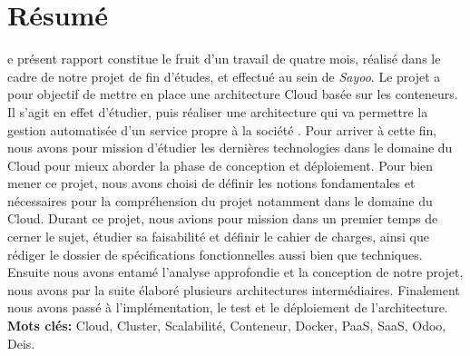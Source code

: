 
\chapter*{Résumé}

\begin{onehalfspace}
e présent rapport constitue le fruit d'un travail de quatre mois, réalisé dans le cadre de notre projet de fin d'études, et effectué au sein de \emph{Sayoo}. Le projet a pour objectif de mettre en place une architecture Cloud basée sur les conteneurs.
\newline
\newline
Il s'agit en effet d'étudier, puis réaliser une architecture qui va permettre la gestion automatisée d'un service propre à la société . Pour arriver à cette fin, nous avons pour mission d'étudier les dernières technologies dans le domaine du Cloud pour mieux aborder la phase de conception et déploiement. 
\noindent Pour bien mener ce projet, nous avons choisi de définir les notions fondamentales et nécessaires pour la compréhension du projet notamment dans le domaine du Cloud.
\newline
\newline
Durant ce projet, nous avions pour mission dans un premier temps de cerner le sujet, étudier sa faisabilité et définir le cahier de charges, ainsi que rédiger le dossier de spécifications fonctionnelles aussi bien que techniques. Ensuite nous avons entamé l'analyse approfondie et la conception de notre projet, nous avons par la suite élaboré plusieurs architectures intermédiaires. Finalement nous avons passé à l'implémentation, le test et le déploiement de l'architecture.
\vfill{\textbf{Mots clés:} Cloud, Cluster, Scalabilité, Conteneur, Docker, PaaS, SaaS, Odoo, Deis.}
\end{onehalfspace}